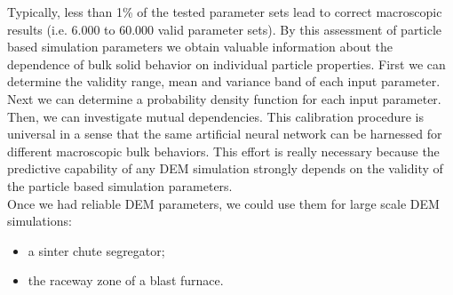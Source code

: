 Typically, less than 1\% of the tested parameter sets lead to correct
macroscopic results (i.e. 6.000 to 60.000 valid parameter sets).
By this assessment of particle based simulation parameters we obtain valuable information about the dependence 
of bulk solid behavior on individual particle properties.
First we can determine the validity range, mean and variance band of each input
parameter. Next we can determine a probability density function for each input
parameter. Then, we can investigate mutual dependencies.
This calibration procedure is universal in a sense that the same artificial neural network can be harnessed for 
different macroscopic bulk behaviors.
This effort is really necessary because the predictive capability of any \acs{DEM}
simulation strongly depends on the validity of the particle 
based simulation parameters.\\
Once we had reliable \acs{DEM} parameters, we could use them for large scale \acs{DEM}
simulations:
\begin{itemize}
\item{a sinter chute segregator;}
\item{the raceway zone of a blast furnace.}
\end{itemize}